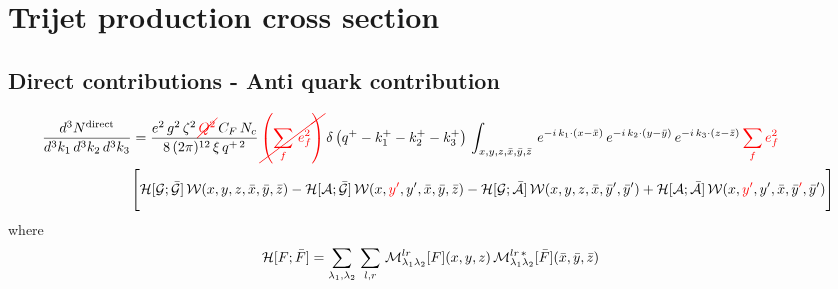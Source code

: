 \documentclass[9pt]{article}
\newcommand{\chg}[1]{{\color{red}#1}}
\newcommand{\del}[1]{{\color{red}\cancel{#1}}}
\numberwithin{equation}{section}
\begin{document}
\section{Trijet production cross section}
\subsection{Direct contributions - Anti quark contribution}
\begin{align}
     \frac{d^{3}N^{\text{direct}}}{d^{3}k_{1}\,d^{3}k_{2}\, d^{3}k_{3}} & = \frac{e^{2}\,g^{2}\,\zeta^{2}\,\del{Q^{2}}\,C_{F}\,N_{c}}{8\, (2\pi)^{12}\,\xi\,q^{+\,2}}\, \del{\left(\sum_{f}\, e^{2}_{f}\right)}\, \delta\left(q^{+}-k^{+}_{1}-k^{+}_{2}-k^{+}_{3}\right)\, \int_{x,y,z,\Bar{x},\Bar{y},\Bar{z}}\, e^{-i\,k_{1}\cdot (x-\Bar{x})}\, e^{-i\,k_{2}\cdot (y-\Bar{y})}\, e^{-i\,k_{3}\cdot (z-\Bar{z})}\,\chg{\sum_{f}e^{2}_{f}}\notag \\ & \Bigg[\mathcal{H}[\mathcal{G};\mathcal{\Bar{G}}]\,\mathcal{W}(x,y,z,\Bar{x},\Bar{y},\Bar{z})-\mathcal{H}[\mathcal{A};\mathcal{\Bar{G}}]\,\mathcal{W}(x,\chg{y'},y',\Bar{x},\Bar{y},\Bar{z})-\mathcal{H}[\mathcal{G};\mathcal{\Bar{A}}]\,\mathcal{W}(x,y,z,\Bar{x},\Bar{y}',\Bar{y}')+\mathcal{H}[\mathcal{A};\mathcal{\Bar{A}}]\,\mathcal{W}(x,\chg{y'},y',\Bar{x},\Bar{y}\chg{'},\Bar{y}')\Bigg]
\label{chg:Q2}\end{align}
where
\begin{align}
    \mathcal{H}[F;\Bar{F}] & = \sum_{\lambda_{1},\lambda_{2}}\,\sum_{l,r}\, \mathcal{M}^{lr}_{\lambda_{1}\lambda_{2}}[F](x,y,z)\,\mathcal{M}^{lr\,*}_{\lambda_{1}\lambda_{2}}[\Bar{F}](\Bar{x},\Bar{y},\Bar{z})
\end{align}
\end{document}
